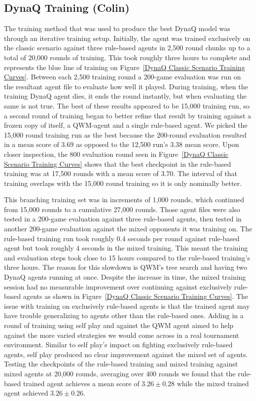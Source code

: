\documentclass[article, 10pt]{IEEEtran}
\begin{document}
\subsection{DynaQ Training (Colin)}\label{subsec:DynaQ Training}
The training method that was used to produce the best DynaQ model was through an iterative training setup. Initially, the agent was trained exclusively on the classic scenario against three rule-based agents in 2,500 round chunks up to a total of 20,000 rounds of training. This took roughly three hours to complete and represents the blue line of training on Figure~\ref{DynaQ Classic Scenario Training Curves}. Between each 2,500 training round a 200-game evaluation was run on the resultant agent file to evaluate how well it played. During training, when the training DynaQ agent dies, it ends the round instantly, but when evaluating the same is not true. The best of these results appeared to be 15,000 training run, so a second round of training began to better refine that result by training against a frozen copy of itself, a QWM-agent and a single rule-based agent. We picked the 15,000 round training run as the best because the 200-round evaluation resulted in a mean score of 3.69 as opposed to the 12,500 run's 3.38 mean score. Upon closer inspection, the 800 evaluation round seen in Figure~\ref{DynaQ Classic Scenario Training Curves} shows that the best checkpoint in the rule-based training was at 17,500 rounds with a mean score of 3.70. The interval of that training overlaps with the 15,000 round training so it is only nominally better. 

This branching training set was in increments of 1,000 rounds, which continued from 15,000 rounds to a cumulative 27,000 rounds. Those agent files were also tested in a 200-game evaluation against three rule-based agents, then tested in another 200-game evaluation against the mixed opponents it was training on. The rule-based training run took roughly 0.4 seconds per round against rule-based agent but took roughly 4 seconds in the mixed training. This meant the training and evaluation steps took close to 15 hours compared to the rule-based training's three hours. The reason for this slowdown is QWM's tree search and having two DynaQ agents running at once. Despite the increase in time, the mixed training session had no measurable improvement over continuing against exclusively rule-based agents as shown in Figure~\ref{DynaQ Classic Scenario Training Curves}. The issue with training on exclusively rule-based agents is that the trained agent may have trouble generalizing to agents other than the rule-based ones. Adding in a round of training using self play and against the QWM agent aimed to help against the more varied strategies we would come across in a real tournament environment. Similar to self play's impact on fighting exclusively rule-based agents, self play produced no clear improvement against the mixed set of agents. Testing the checkpoints of the rule-based training and mixed training against mixed agents at 20,000 rounds, averaging over 400 rounds we found that the rule-based trained agent achieves a mean score of $3.26 \pm 0.28$ while the mixed trained agent achieved $3.26 \pm 0.26$.
\end{document}
